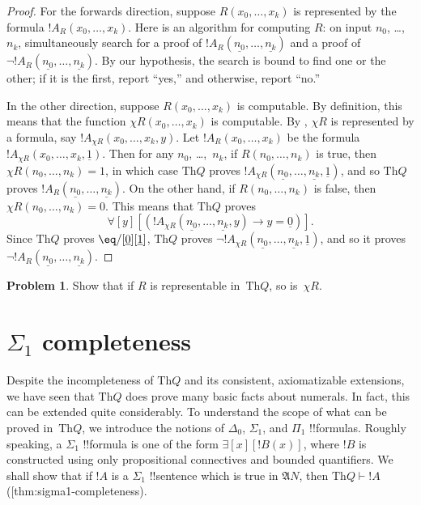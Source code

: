 \documentclass[10pt,a4paper]{article}
\makeatletter
\theoremstyle{plain}
\theoremstyle{definition}
\newtheorem{prob}{Problem}[section]
\theoremstyle{remark}
\newcommand*{\olfileid}[3]{}
\newcommand*{\olsection}[1]{\section*{#1}}
\newcommand{\olref}{\@ifnextchar[{\olref@i}{\olref@final}}
\def\olref@i[#1]{\@ifnextchar[{\olref@ii}{\olref@final}}
\def\olref@ii[#1]{\@ifnextchar[{\olref@iii}{\olref@final}}
\def\olref@iii[#1]{\olref@final}
\def\olref@final#1{\ref{#1}}
\providecommand{\lif}{\mathbin{\rightarrow}}
\providecommand{\lforall}{\mathord{\forall}}
\providecommand{\lexists}{\mathord{\exists}}
\providecommand{\Proves}{\mathrel{\vdash}}
\providecommand{\Struct}{\ensuremath{\mathfrak{A}}}
\providecommand{\Th}{\ensuremath{\mathrm{Th}}}
\providecommand{\num}[1]{\underline{#1}}
\providecommand{\Char}{\chi}
\makeatother
\begin{document}
\begin{proof}
For the forwards direction, suppose $R(x_0,\dots,x_k)$ is
represented by the formula $!A_R(x_0,\dots,x_k)$. Here is an
algorithm for computing $R$: on input $n_0$, \dots,~$n_k$, simultaneously
search for a proof of $!A_R(\num{n_0}, \dots, \num{n_k})$ and a proof of
$\lnot !A_R(\num{n_0}, \dots, \num{n_k})$. By our hypothesis, the search
is bound to find one or the other; if it is the first, report ``yes,''
and otherwise, report ``no.''

In the other direction, suppose $R(x_0, \dots, x_k)$ is computable. By
definition, this means that the function $\Char{R}(x_0, \dots, x_k)$
is computable. By \olref[int]{thm:representable-iff-comp}, $\Char{R}$
is represented by a formula, say $!A_{\Char{R}}(x_0, \dots, x_k,
y)$. Let $!A_R(x_0, \dots, x_k)$ be the formula $!A_{\Char{R}}(x_0,
\dots, x_k, \num{1})$. Then for any $n_0$, \dots,~$n_k$, if $R(n_0,
\dots, n_k)$ is true, then $\Char{R}(n_0, \dots, n_k) = 1$, in which
case $\Th{Q}$ proves $!A_{\Char{R}}(\num{n_0}, \dots, \num{n_k},
\num{1})$, and so $\Th{Q}$ proves $!A_R(\num{n_0}, \dots,
\num{n_k})$. On the other hand, if $R(n_0, \dots, n_k)$ is false, then
$\Char{R}(n_0, \dots, n_k) = 0$. This means that $\Th{Q}$ proves
\[
\lforall[y][(!A_{\Char{R}}(\num{n_0}, \dots, \num{n_k}, y) \lif y =
  \num{0})].
\]
Since $\Th{Q}$ proves $\eq/[\num{0}][\num{1}]$, $\Th{Q}$ proves
$\lnot !A_{\Char{R}}(\num{n_0}, \dots, \num{n_k}, \num{1})$, and so it
proves $\lnot !A_R(\num{n_0}, \dots, \num{n_k})$.
\end{proof}

\begin{prob}
Show that if $R$ is representable in~$\Th{Q}$, so is~$\Char{R}$.
\end{prob}





\olfileid{inc}{inp}{s1c}
\olsection{\texorpdfstring{$\Sigma_1$}{Sigma-1} completeness}

Despite the incompleteness of $\Th{Q}$ and its consistent, axiomatizable
extensions, we have seen that $\Th{Q}$ does prove many basic facts about
numerals. In fact, this can be extended quite considerably. To understand
the scope of what can be proved in~$\Th{Q}$, we introduce the notions of
$\Delta_0$, $\Sigma_1$, and $\Pi_1$ !!{formula}s. Roughly speaking, a
$\Sigma_1$ !!{formula} is one of the form $\lexists[x][!B(x)]$, where $!B$
is constructed using only propositional connectives and bounded
quantifiers. We shall show that if $!A$ is a $\Sigma_1$ !!{sentence}
which is true in $\Struct{N}$, then $\Th{Q} \Proves !A$
(\olref{thm:sigma1-completeness}).
\end{document}
